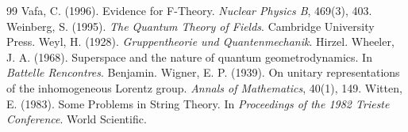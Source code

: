 \documentclass[11pt,a4paper]{article}
\begin{document}
\begin{thebibliography}{99}
Vafa, C. (1996). Evidence for F-Theory. \emph{Nuclear Physics B}, 469(3), 403.
Weinberg, S. (1995). \emph{The Quantum Theory of Fields}. Cambridge University Press.
Weyl, H. (1928). \emph{Gruppentheorie und Quantenmechanik}. Hirzel.
Wheeler, J. A. (1968). Superspace and the nature of quantum geometrodynamics. In \emph{Battelle Rencontres}. Benjamin.
Wigner, E. P. (1939). On unitary representations of the inhomogeneous Lorentz group. \emph{Annals of Mathematics}, 40(1), 149.
Witten, E. (1983). Some Problems in String Theory. In \emph{Proceedings of the 1982 Trieste Conference}. World Scientific.
\end{thebibliography}
\endgroup
\end{document}

